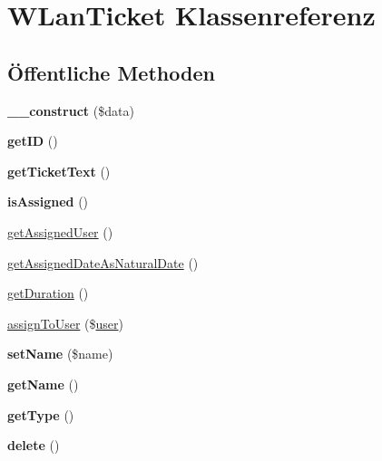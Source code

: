 \hypertarget{class_w_lan_ticket}{}\section{W\+Lan\+Ticket Klassenreferenz}
\label{class_w_lan_ticket}
\subsection*{Öffentliche Methoden}
\begin{DoxyCompactItemize}
\item 
\mbox{\label{class_w_lan_ticket_afb9065d3fcb04176f5333c1274dfc4b2}} 
{\bfseries \+\_\+\+\_\+construct} (\$data)
\item 
\mbox{\label{class_w_lan_ticket_a9eefc3caa19d88d88d1acbace8593198}} 
{\bfseries get\+ID} ()
\item 
\mbox{\label{class_w_lan_ticket_a83d47e69740dd163f011503f58e6b2d7}} 
{\bfseries get\+Ticket\+Text} ()
\item 
\mbox{\label{class_w_lan_ticket_af0d998d4054e4377791905bb7ca9fc7b}} 
{\bfseries is\+Assigned} ()
\item 
\mbox{\hyperlink{class_w_lan_ticket_a0b376222222574034aa6b8d693cfca04}{get\+Assigned\+User}} ()
\item 
\mbox{\hyperlink{class_w_lan_ticket_a6ab549874600bde7ed6bd98535bca4f0}{get\+Assigned\+Date\+As\+Natural\+Date}} ()
\item 
\mbox{\hyperlink{class_w_lan_ticket_acebd8f64f4b8e4ff528c25778c0fb25d}{get\+Duration}} ()
\item 
\mbox{\hyperlink{class_w_lan_ticket_ab59b1428f1f1d99e28f5b0244dd5063b}{assign\+To\+User}} (\$\mbox{\hyperlink{classuser}{user}})
\item 
\mbox{\label{class_w_lan_ticket_a1c010a41b1357b59e0e960214a59442c}} 
{\bfseries set\+Name} (\$name)
\item 
\mbox{\label{class_w_lan_ticket_a03460b0327c8fb517dda8501f549a803}} 
{\bfseries get\+Name} ()
\item 
\mbox{\label{class_w_lan_ticket_a4c5f2cc39f4f05fd1f6f6ce4bf4fefb6}} 
{\bfseries get\+Type} ()
\item 
\mbox{\label{class_w_lan_ticket_acecddf7a126bc3740e2da6f538c62269}} 
{\bfseries delete} ()
\end{DoxyCompactItemize}
